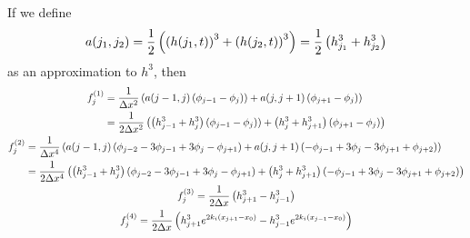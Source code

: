 If we define 
\begin{equation*}
    a\!\left( j_1, j_2 \right) = \frac{1}{2} \left( \left( h\!\left( j_1, t \right) \right)^3 + \left( h\!\left( j_2, t \right) \right)^3 \right) = \frac{1}{2} \left( h_{j_1}^3 + h_{j_2}^3 \right)
\end{equation*}
as an approximation to $h^3$, then 
\begin{gather*}
\begin{aligned}
    f_j^{(1)} &= \frac{1}{\Delta x^2} \left( a\!\left( j-1, j \right)\left( \phi_{j-1} - \phi_{j}) \right) + a\!\left( j, j+1 \right)\left( \phi_{j+1} - \phi_{j} \right) \right)\\
    &= \frac{1}{2\Delta x^2} \left( \left( h_{j-1}^3 + h_{j}^3 \right)\left( \phi_{j-1} - \phi_{j}) \right) + \left( h_{j}^3 + h_{j+1}^3 \right)\left( \phi_{j+1} - \phi_{j} \right) \right)
\end{aligned}\\
\begin{aligned}
    f_j^{(2)} &= \frac{1}{\Delta x^4} \left( a\!\left( j-1, j \right)\left( \phi_{j-2} - 3\phi_{j-1} + 3\phi_{j} - \phi_{j+1} \right) + a\!\left( j, j+1 \right)\left( -\phi_{j-1} + 3\phi_{j} - 3\phi_{j+1} + \phi_{j+2} \right) \right)\\
    &= \frac{1}{2\Delta x^4} \left( \left( h_{j-1}^3 + h_{j}^3 \right) \left( \phi_{j-2} - 3\phi_{j-1} + 3\phi_{j} - \phi_{j+1} \right) + \left( h_{j}^3 + h_{j+1}^3 \right) \left( -\phi_{j-1} + 3\phi_{j} - 3\phi_{j+1} + \phi_{j+2} \right) \right)
\end{aligned}\\
\begin{aligned}
    f_j^{(3)} = \frac{1}{2\Delta x} \left( h_{j+1}^3 - h_{j-1}^3 \right)
\end{aligned}\\
\begin{aligned}
    f_j^{(4)} = \frac{1}{2\Delta x} \left( h_{j+1}^3 e^{2k_i \left( x_{j+1} - x_0 \right)} - h_{j-1}^3 e^{2k_i \left( x_{j-1} - x_0 \right)} \right)
\end{aligned}
\end{gather*}
